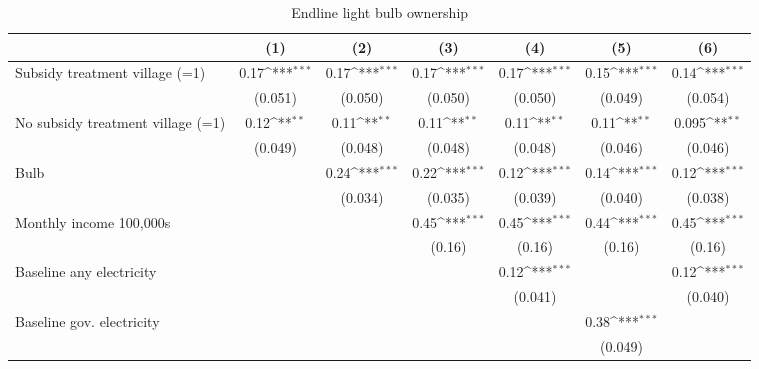 \begin{table}[htbp]\centering
\def\sym#1{\ifmmode^{#1}\else\(^{#1}\)\fi}
\caption{Endline light bulb ownership}
\begin{tabular*}{1\hsize}{@{\hskip\tabcolsep\extracolsep\fill}l*{6}{c}}
\toprule
                &\multicolumn{1}{c}{(1)}         &\multicolumn{1}{c}{(2)}         &\multicolumn{1}{c}{(3)}         &\multicolumn{1}{c}{(4)}         &\multicolumn{1}{c}{(5)}         &\multicolumn{1}{c}{(6)}         \\
\midrule
Subsidy treatment village (=1)&     0.17\sym{***}&     0.17\sym{***}&     0.17\sym{***}&     0.17\sym{***}&     0.15\sym{***}&     0.14\sym{***}\\
                &  (0.051)         &  (0.050)         &  (0.050)         &  (0.050)         &  (0.049)         &  (0.054)         \\
No subsidy treatment village (=1)&     0.12\sym{**} &     0.11\sym{**} &     0.11\sym{**} &     0.11\sym{**} &     0.11\sym{**} &    0.095\sym{**} \\
                &  (0.049)         &  (0.048)         &  (0.048)         &  (0.048)         &  (0.046)         &  (0.046)         \\
Bulb            &                  &     0.24\sym{***}&     0.22\sym{***}&     0.12\sym{***}&     0.14\sym{***}&     0.12\sym{***}\\
                &                  &  (0.034)         &  (0.035)         &  (0.039)         &  (0.040)         &  (0.038)         \\
Monthly income 100,000s&                  &                  &     0.45\sym{***}&     0.45\sym{***}&     0.44\sym{***}&     0.45\sym{***}\\
                &                  &                  &   (0.16)         &   (0.16)         &   (0.16)         &   (0.16)         \\
Baseline any electricity&                  &                  &                  &     0.12\sym{***}&                  &     0.12\sym{***}\\
                &                  &                  &                  &  (0.041)         &                  &  (0.040)         \\
Baseline gov. electricity&                  &                  &                  &                  &     0.38\sym{***}&                  \\
                &                  &                  &                  &                  &  (0.049)         &                  \\

\end{tabular*}
\end{table}
